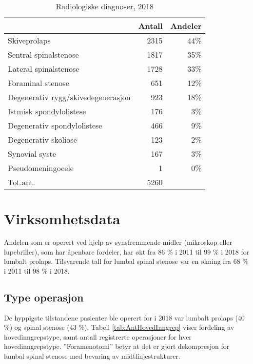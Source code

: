 \documentclass [norsk,a4paper,twoside]{article}\usepackage[]{graphicx}\usepackage[]{color}
\begin{document}
\begin{table}[ht]
\centering
\begin{tabular}{lrr}
  \hline
 & Antall & Andeler \\ 
  \hline
Skiveprolaps & 2315 & 44\% \\ 
  Sentral spinalstenose & 1817 & 35\% \\ 
  Lateral spinalstenose & 1728 & 33\% \\ 
  Foraminal stenose & 651 & 12\% \\ 
  Degenerativ rygg/skivedegenerasjon & 923 & 18\% \\ 
  Istmisk spondylolistese & 176 & 3\% \\ 
  Degenerativ spondylolistese & 466 & 9\% \\ 
  Degenerativ skoliose & 123 & 2\% \\ 
  Synovial syste & 167 & 3\% \\ 
  Pseudomeningocele & 1 & 0\% \\ 
  Tot.ant. & 5260 &   \\ 
   \hline
\end{tabular}
\caption{Radiologiske diagnoser, 2018} 
\label{tab:RF}
\end{table}





\section{Virksomhetsdata}

Andelen som er operert ved hjelp av synsfremmende midler (mikroskop eller
lupebriller), som har åpenbare fordeler, har økt fra 86 \% i 2011 til 
99 \% i 2018 for lumbalt prolaps. 
Tilsvarende tall for lumbal spinal stenose var en økning fra 68 \% i 2011 til 
98 \% i 2018.



\subsection{Type operasjon}



De hyppigste tilstandene pasienter ble operert for i 2018 var lumbalt prolaps (40 \%) og spinal stenose (43 \%). Tabell \ref{tab:AntHovedInngrep} viser fordeling av hovedinngrepstype, samt antall registrerte operasjoner for hver hovedinngrepstype.
''Foramenotomi'' betyr at det er gjort dekompresjon for lumbal spinal stenose med bevaring av midtlinjestrukturer. 
\end{document}
